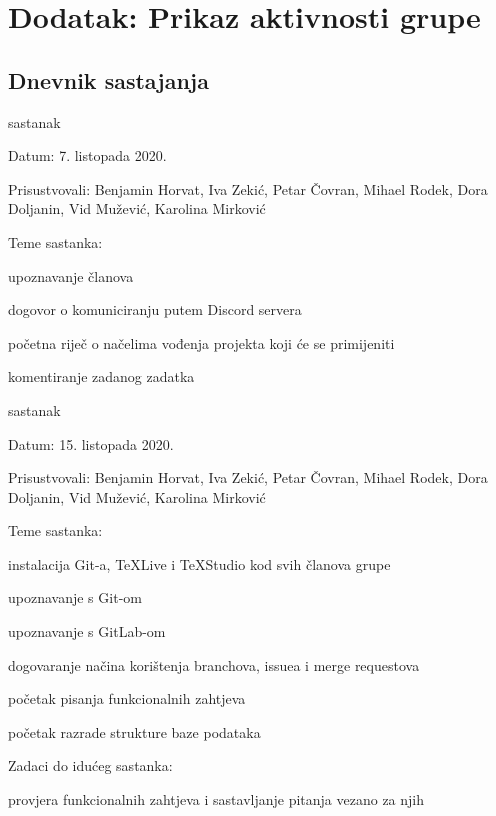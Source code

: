 \chapter*{Dodatak: Prikaz aktivnosti grupe}
		
		\section*{Dnevnik sastajanja}
		
		
		\begin{packed_enum}
			\item  sastanak
			
			\item[] \begin{packed_item}
				\item Datum: 7. listopada 2020.
				\item Prisustvovali: Benjamin Horvat, Iva Zekić, Petar Čovran, Mihael Rodek, Dora Doljanin, Vid Mužević, Karolina Mirković
				\item Teme sastanka:
				\begin{packed_item}
					\item  upoznavanje članova
					\item  dogovor o komuniciranju putem Discord servera
					\item  početna riječ o načelima vođenja projekta koji će se primijeniti
					\item  komentiranje zadanog zadatka
				\end{packed_item}
			\end{packed_item}
			
			\item  sastanak
			\item[] \begin{packed_item}
				\item Datum: 15. listopada 2020.
				\item Prisustvovali: Benjamin Horvat, Iva Zekić, Petar Čovran, Mihael Rodek, Dora Doljanin, Vid Mužević, Karolina Mirković
				\item Teme sastanka:
				\begin{packed_item}
					\item  instalacija Git-a, TeXLive i TeXStudio kod svih članova grupe
					\item  upoznavanje s Git-om
					\item  upoznavanje s GitLab-om
					\item  dogovaranje načina korištenja branchova, issuea i merge requestova
					\item  početak pisanja funkcionalnih zahtjeva
					\item  početak razrade strukture baze podataka 
				\end{packed_item}
				\item Zadaci do idućeg sastanka:
				\begin{packed_item}
					\item  provjera funkcionalnih zahtjeva i sastavljanje pitanja vezano za njih
				\end{packed_item}
			\end{packed_item}
		

\end{packed_enum}
